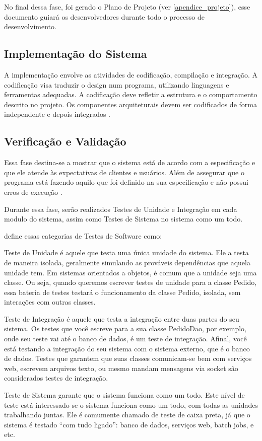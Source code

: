 No final dessa fase, foi gerado o Plano de Projeto (ver \autoref{apendice_projeto}), esse documento guiar\'a os desenvolvedores durante 
todo o processo de desenvolvimento.

\subsection{Implementação do Sistema}

A implementação envolve as atividades de codificação, compilação e integração. A codificação visa traduzir o design num programa, utilizando linguagens e  ferramentas adequadas. A codificação deve refletir a estrutura e o comportamento descrito no projeto. Os componentes arquiteturais devem ser codificados de forma independente e depois integrados \cite{aguiar2012requisitos}.

\subsection{Verificação e Validação}
Essa fase destina-se a mostrar que o sistema está de acordo com a especificação 
e que ele atende às expectativas de clientes e usuários. Al\'em de assegurar 
que o  programa está fazendo aquilo que foi definido na sua especificação e não 
possui  erros  de  execução \cite{aguiar2012requisitos}. 

Durante essa fase, ser\~ao realizados Testes de Unidade e Integra\c{c}\~ao em 
cada modulo do sistema, assim como Testes de Sistema no sistema como um todo.

 define essas categorias de Testes de Software como:

\begin{alineascomponto}
	\item Teste de Unidade é aquele que testa uma única unidade do sistema. 
Ele a testa de maneira isolada, geralmente simulando as prováveis dependências 
que aquela unidade tem. Em sistemas orientados a objetos, é comum que a unidade 
seja uma classe. Ou seja, quando queremos escrever testes de unidade para a 
classe Pedido, essa bateria de testes testará o funcionamento da classe Pedido, 
isolada, sem interações com outras classes.

	\item  Teste de Integração é aquele que testa a integração entre duas 
partes do seu sistema. Os testes que você escreve para a sua classe PedidoDao, 
por exemplo, onde seu teste vai até o banco de dados, é um teste de integração. 
Afinal, você está testando a integração do seu sistema com o sistema externo, 
que é o banco de dados. Testes que garantem que suas classes comunicam-se bem 
com serviços web, escrevem arquivos texto, ou mesmo mandam mensagens via socket 
são considerados testes de integração.

	\item Teste de Sistema garante que o sistema funciona como um todo. Este 
nível de teste está interessado se o sistema funciona como um todo, com todas as 
unidades trabalhando juntas. Ele é comumente chamado de teste de caixa preta, já 
que o sistema é testado “com tudo ligado”: banco de dados, serviços web, batch 
jobs, e etc. 
\end{alineascomponto}

